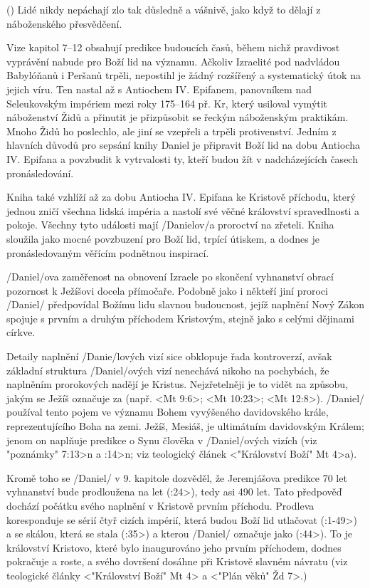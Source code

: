  (\kern-2mm) {
Lidé nikdy nepáchají zlo tak důsledně a vášnivě,
jako když to dělají z náboženského přesvědčení.
}

Vize kapitol 7--12 obsahují predikce budoucích časů, během nichž pravdivost vyprávění nabude pro Boží lid na významu.
Ačkoliv Izraelité pod nadvládou Babylóňanů i Peršanů trpěli, nepostihl je žádný rozšířený a systematický útok na jejich víru. Ten nastal až s Antiochem IV. Epifanem, panovníkem nad Seleukovským impériem mezi roky 175--164 př. Kr, který usiloval vymýtit náboženství Židů a přinutit je přizpůsobit se řeckým náboženským praktikám. Mnoho Židů ho poslechlo, ale jiní se vzepřeli a trpěli protivenství. 
Jedním z hlavních důvodů pro sepsání knihy Daniel je připravit Boží lid na dobu Antiocha IV. Epifana a povzbudit k vytrvalosti ty, kteří budou žít v nadcházejících časech pronásledování.


Kniha také vzhlíží až za dobu Antiocha IV. Epifana ke Kristově příchodu, který jednou zničí všechna lidská impéria a nastolí své věčné království spravedlnosti a pokoje. Všechny tyto události mají \x/Danielov/a proroctví na zřeteli.
Kniha sloužila jako mocné povzbuzení pro Boží lid, trpící útiskem, a dodnes je pronásledovaným věřícím podnětnou inspirací. 


\x/Daniel/ova zaměřenost na obnovení Izraele po skončení vyhnanství obrací pozornost k Ježíšovi docela přímočaře.
Podobně jako i někteří jiní proroci \x/Daniel/ předpovídal Božímu lidu slavnou budoucnost, jejíž naplnění Nový Zákon 
spojuje s prvním a druhým příchodem Kristovým, stejně jako s celými dějinami církve.

Detaily naplnění \x/Danie/lových vizí sice obklopuje řada kontroverzí, avšak základní struktura \x/Daniel/ových vizí nenechává nikoho na pochybách, že naplněním prorokových nadějí je Kristus.
Nejzřetelněji je to vidět na způsobu, jakým se Ježíš označuje za  (např. <Mt 9:6>; <Mt 10:23>; <Mt 12:8>).
\x/Daniel/ používal tento pojem ve významu Bohem vyvýšeného davidovského krále, reprezentujícího Boha na zemi.
Ježíš, Mesiáš, je ultimátním davidovským Králem; jenom on naplňuje predikce o Synu člověka v \x/Daniel/ových vizích (viz \<"poznámky" 7:13>n a :14>n; viz teologický článek 
<"Království Boží"  Mt 4>a). 

Kromě toho se \x/Daniel/ v 9. kapitole dozvěděl, že Jeremjášova predikce 70 let vyhnanství bude prodloužena 
na  let (:24>), tedy asi 490 let.
Tato předpověď dochází počátku svého naplnění v Kristově prvním příchodu. Prodleva koresponduje se sérií čtyř cizích impérií, která budou Boží lid utlačovat (:1-49>) a se skálou, která se stala  (:35>) a kterou \x/Daniel/ označuje jako  (:44>). 
To je království Kristovo, které bylo inaugurováno jeho prvním příchodem, dodnes pokračuje a roste, a svého dovršení dosáhne při Kristově slavném návratu (viz teologické články <"Království Boží" Mt 4> a <"Plán věků" Žd 7>.)


